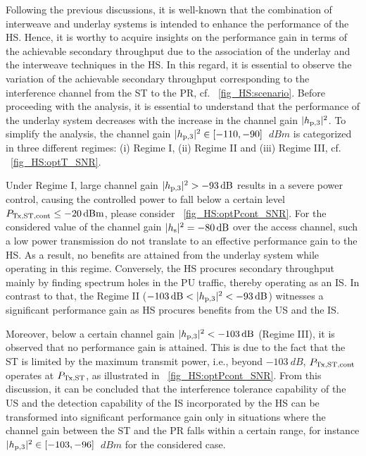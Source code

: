 Following the previous discussions, it is well-known that the combination of interweave and underlay systems is intended to enhance the performance of the HS. Hence, it is worthy to acquire insights on the performance gain in terms of the achievable secondary throughput due to the association of the underlay and the interweave techniques in the HS. In this regard, it is essential to observe the variation of the achievable secondary throughput corresponding to the interference channel from the ST to the PR, cf. \figurename~\ref{fig_HS:scenario}. Before proceeding with the analysis, it is essential to understand that the performance of the underlay system decreases with the increase in the channel gain $|h_{\text{p,3}}|^2$. To simplify the analysis, the channel gain $|h_{\text{p,3}}|^2 \in [-110, -90]$ $\SI{}{dBm}$ is categorized in three different regimes: (i) Regime I, (ii) Regime II and (iii) Regime III, cf. \figurename~\ref{fig_HS:optT_SNR}. 

Under Regime I, large channel gain $|h_{\text{p,3}}|^2 > -\SI{93}{dB}$ results in a severe power control, causing the controlled power to fall below a certain level $P_{\text{Tx,ST,cont}} \le \SI{-20}{dBm}$, please consider \figurename~\ref{fig_HS:optPcont_SNR}. For the considered value of the channel gain $|h_{\text{s}}|^2 = \SI{-80}{dB}$ over the access channel, such a low power transmission do not translate to an effective performance gain to the HS. As a result, no benefits are attained from the underlay system while operating in this regime. Conversely, the HS procures secondary throughput mainly by finding spectrum holes in the PU traffic, thereby operating as an IS. In contrast to that, the Regime II ($-\SI{103}{dB} < |h_{\text{p,3}}|^2 < -\SI{93}{dB}$) witnesses a significant performance gain as HS procures benefits from the US and the IS. 

Moreover, below a certain channel gain $|h_{\text{p,3}}|^2 < \SI{-103}{dB}$ (Regime III), it is observed that no performance gain is attained. This is due to the fact that the ST is limited by the maximum transmit power, i.e., beyond $\SI{-103}{dB}$, $P_{\text{Tx,ST,cont}}$ operates at $P_{\text{Tx,ST}}$, as illustrated in \figurename~\ref{fig_HS:optPcont_SNR}. From this discussion, it can be concluded that the interference tolerance capability of the US and the detection capability of the IS incorporated by the HS can be transformed into significant performance gain only in situations where the channel gain between the ST and the PR falls within a certain range, for instance $|h_{\text{p,3}}|^2 \in [-103,-96]$ $\SI{}{dBm}$ for the considered case.



